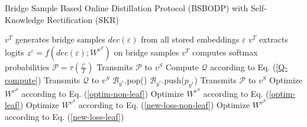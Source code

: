 \documentclass[10pt,journal]{IEEEtran}
\begin{document}
\begin{algorithm}[t]
\newcommand{\removelatexerror}{\let\@latex@error\@gobble}
	\caption{Bridge Sample Based Online Distillation Protocol (BSBODP) with Self-Knowledge Rectification (SKR)}
	\SetAlgoNoLine

	\label{alg-bsbodp-akr}
	\begin{spacing}{0.65}
        \begin{algorithmic}[0]
        
           \State {}
          \State {}
          \State {}
		\EndProcedure


            \State 
                $v^{T}$ generates bridge samples $dec(\varepsilon)$ from all stored embeddings $\varepsilon$
            \State $v^{T}$ extracts logits ${z^\varepsilon} = f(dec(\varepsilon );{W^{{v^T}}})$ on bridge samples
            \State $v^{T}$ computes softmax probabilities $\mathcal{P}=\tau(\frac{{{z^\varepsilon }}}{T})$
            \State {}
            {
                \State {}
                {
                    \State Transmits $\mathcal{P}$ to $v^{S}$
                }
                \State \Else
                {
                    \State Compute $\mathcal{Q}$ according to Eq. (\ref{Q-compute})
                    \State Transmits $\mathcal{Q}$ to $v^{S}$
                }
            }
            \State \Else
            {
                \State {}
                {
                    $\mathcal{B}_{{y^*}}$.pop()
                }
                \State $\mathcal{B}_{{y^*}}$.push($p_{{y^*}}$)
                \State Transmits $\mathcal{P}$ to $v^{S}$
            }
            \State {}
            {            
            \State {}
            {
            \State Optimize $W^{v^{S}}$ according to Eq. (\ref{optim-non-leaf})
            }
            \State \Else
            {
            \State Optimize $W^{v^{S}}$ according to Eq. (\ref{optim-leaf})
            }
            }
            \State \Else
            {
            \State {}
            {
            \State Optimize $W^{v^{S}}$ according to Eq. (\ref{new-loss-non-leaf})
            }
            \State \Else
            {
            \State Optimize $W^{v^{S}}$ according to Eq. (\ref{new-loss-leaf})
            }
            }
            \EndProcedure   
           \end{algorithmic}
	\end{spacing}
\end{algorithm}
\end{document}
